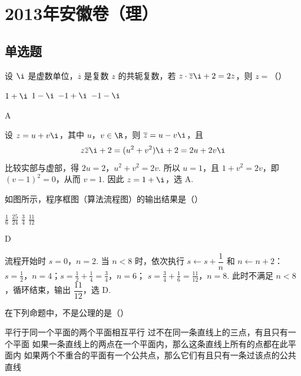 \chapter{2013年安徽卷（理）}

\section{单选题}

\begin{problem}
设 \(\i\) 是虚数单位，\(\overline{z}\) 是复数 \(z\) 的共轭复数，若 \(z \cdot \overline{z}\i + 2 = 2z\)，则 \(z =\)（\quad）

\choices
    {\(1 + \i\)}
    {\(1 - \i\)}
    {\(-1 + \i\)}
    {\(-1 - \i\)}
\end{problem}

\begin{answer}
A
\end{answer}

\begin{solution}
设 \(z=u+v\i\)，其中 \(u\)，\(v\in\R\)，则 \(\overline{z}=u-v\i\)，且
\[
z\overline{z}\i+2=(u^2+v^2)\i+2=2u+2v\i
\]
比较实部与虚部，得
\(2u=2\)，\(u^2+v^2=2v\).
所以 \(u=1\)，且 \(1+v^2=2v\)，即 \((v-1)^2=0\)，从而 \(v=1\). 因此 \(z=1+\i\)，选 A.
\end{solution}

\begin{problem}
如图所示，程序框图（算法流程图）的输出结果是（\quad）


\choices
    {\(\frac{1}{6}\)}
    {\(\frac{25}{24}\)}
    {\(\frac{3}{4}\)}
    {\(\frac{11}{12}\)}
\end{problem}

\begin{answer}
D
\end{answer}

\begin{solution}
流程开始时 \(s=0\)，\(n=2\). 当 \(n<8\) 时，依次执行 \(s\leftarrow s+\dfrac{1}{n}\) 和 \(n\leftarrow n+2\)：
\(s=\frac12\)，\(n=4\)；\(s=\frac12+\frac14=\frac34\)，\(n=6\)；
\(s=\frac34+\frac16=\frac{11}{12}\)，\(n=8\).
此时不满足 \(n<8\)，循环结束，输出 \(\dfrac{11}{12}\)，选 D.
\end{solution}

\begin{problem}
在下列命题中，不是公理的是（\quad）

\choices
    {平行于同一个平面的两个平面相互平行}
    {过不在同一条直线上的三点，有且只有一个平面}
    {如果一条直线上的两点在一个平面内，那么这条直线上所有的点都在此平面内}
    {如果两个不重合的平面有一个公共点，那么它们有且只有一条过该点的公共直线}
\end{problem}

